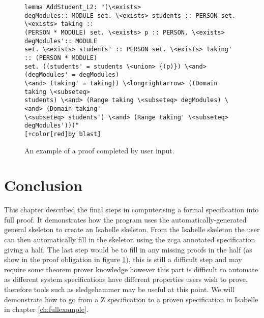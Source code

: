 \begin{center}
\begin{figure}[H]
\centering
\begin{footnotesize}
\begin{BVerbatim}[commandchars=+\[\]]
lemma AddStudent_L2: "(\<exists>
degModules:: MODULE set. \<exists> students :: PERSON set. \<exists> taking ::
(PERSON * MODULE) set. \<exists> p :: PERSON. \<exists> degModules':: MODULE
set. \<exists> students' :: PERSON set. \<exists> taking' :: (PERSON * MODULE)
set. ((students' = students \<union> {(p)}) \<and> (degModules' = degModules)
\<and> (taking' = taking)) \<longrightarrow> ((Domain taking \<subseteq>
students) \<and> (Range taking \<subseteq> degModules) \<and> (Domain taking'
\<subseteq> students') \<and> (Range taking' \<subseteq> degModules')))"
[+color[red]by blast]
\end{BVerbatim}
\end{footnotesize}
\caption{\label{fig:exampleproof} An example of a proof completed by user input.}
\end{figure}
\end{center}

\section{Conclusion}

This chapter described the final steps in computerising a formal specification
into full proof. It demonstrates how the program uses the
automatically-generated
general skeleton to create an Isabelle skeleton. From the Isabelle
skeleton the user can then automatically fill in the skeleton using the
\gls{zcga} annotated specification giving a \gls{half}. The last step would be
to fill in any missing proofs in the \gls{half} (as show in the proof obligation
in figure \ref{fig:exampleproof}), this is still a difficult step
and may require some theorem prover knowledge however this part is difficult to
automate as different system specifications have different properties users wish
to prove, therefore tools such as sledgehammer \cite{sledgehammer} may be useful
at this point. We will demonstrate how to go from a Z specification to a proven 
specification in Isabelle in chapter \ref{ch:fullexample}.